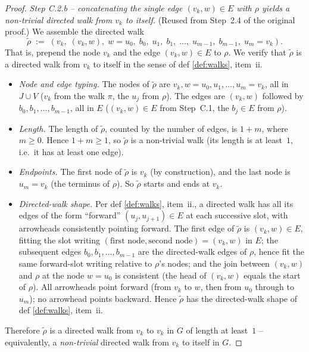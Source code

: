 \documentclass[main]{subfiles}
\begin{document}
\begin{proof}
\smallskip\noindent\emph{Step C.2.b -- concatenating the single edge $(v_k, w) \in E$ with $\rho$ yields a non-trivial directed walk from $v_k$ to itself.}
(Reused from Step~2.4 of the original proof.) We assemble the directed walk
\[
    \widetilde{\rho} \;:=\; (v_k, \;(v_k, w), \;w = u_0, \;b_0, \;u_1, \;b_1, \;\dots, \;u_{m-1}, \;b_{m-1}, \;u_m = v_k).
\]
That is, prepend the node $v_k$ and the edge $(v_k, w) \in E$ to $\rho$. We verify that $\widetilde{\rho}$ is a directed walk from $v_k$ to itself in the sense of def \ref{def:walks}, item~ii.
\begin{itemize}
    \item \emph{Node and edge typing.} The nodes of $\widetilde{\rho}$ are $v_k, w = u_0, u_1, \dots, u_m = v_k$, all in $J \cup V$ ($v_k$ from the walk $\pi$, the $u_j$ from $\rho$). The edges are $(v_k, w)$ followed by $b_0, b_1, \dots, b_{m-1}$, all in $E$ ($(v_k, w) \in E$ from Step~C.1, the $b_j \in E$ from $\rho$).
    \item \emph{Length.} The length of $\widetilde{\rho}$, counted by the number of edges, is $1 + m$, where $m \ge 0$. Hence $1 + m \ge 1$, so $\widetilde{\rho}$ is a non-trivial walk (its length is at least~$1$, i.e.\ it has at least one edge).
    \item \emph{Endpoints.} The first node of $\widetilde{\rho}$ is $v_k$ (by construction), and the last node is $u_m = v_k$ (the terminus of $\rho$). So $\widetilde{\rho}$ starts and ends at $v_k$.
    \item \emph{Directed-walk shape.} Per def \ref{def:walks}, item~ii., a directed walk has all its edges of the form ``forward'' $(u_j, u_{j+1}) \in E$ at each successive slot, with arrowheads consistently pointing forward. The first edge of $\widetilde{\rho}$ is $(v_k, w) \in E$, fitting the slot writing $(\text{first node}, \text{second node}) = (v_k, w)$ in $E$; the subsequent edges $b_0, b_1, \dots, b_{m-1}$ are the directed-walk edges of $\rho$, hence fit the same forward-slot writing relative to $\rho$'s nodes; and the join between $(v_k, w)$ and $\rho$ at the node $w = u_0$ is consistent (the head of $(v_k, w)$ equals the start of $\rho$). All arrowheads point forward (from $v_k$ to $w$, then from $u_0$ through to $u_m$); no arrowhead points backward. Hence $\widetilde{\rho}$ has the directed-walk shape of def \ref{def:walks}, item~ii.
\end{itemize}
Therefore $\widetilde{\rho}$ is a directed walk from $v_k$ to $v_k$ in $G$ of length at least~$1$ -- equivalently, a \emph{non-trivial} directed walk from $v_k$ to itself in $G$.


\end{proof}
\end{document}
